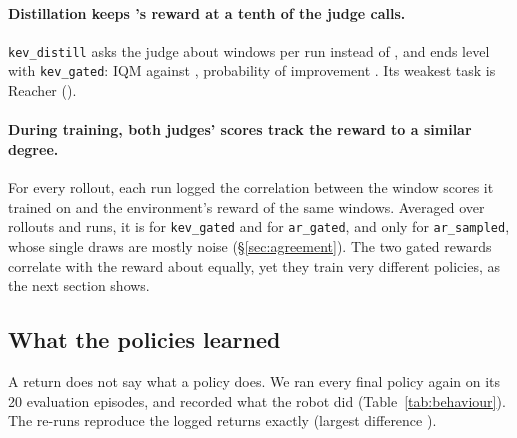 \paragraph{Distillation keeps \kev{}'s reward at a tenth of the judge calls.} \texttt{kev\_distill} asks the judge about
 windows per run instead of , and ends level with \texttt{kev\_gated}:
IQM  against , probability of improvement .
Its weakest task is Reacher ().

\paragraph{During training, both judges' scores track the reward to a similar degree.} For every rollout, each run
logged the correlation between the window scores it trained on and the environment's reward of the same windows. Averaged
over rollouts and runs, it is  for \texttt{kev\_gated} and  for
\texttt{ar\_gated}, and only  for \texttt{ar\_sampled}, whose single draws are mostly noise
(\S\ref{sec:agreement}). The two gated rewards correlate with the reward about equally, yet they train very different
policies, as the next section shows.

\subsection{What the policies learned}\label{sec:behaviour}

A return does not say what a policy does. We ran every final policy again on its 20 evaluation episodes, and recorded what
the robot did (Table~\ref{tab:behaviour}). The re-runs reproduce the logged returns exactly (largest difference
).

\begin{table}[t]
\centering\small

\caption{Behaviour of the final policies, averaged over episodes and seeds (20 evaluation episodes per run).
\emph{still}: fraction of steps with $|v_x|<0.1$\,m/s. \emph{runs flipped}: runs whose cheetah spends more than half of
the steps on its back ($\cos(\text{pitch})<0$). \emph{effort}: mean squared action, in $[0,1]$. \emph{distance}: mean
fingertip--target distance over the episode. The random policy samples its actions uniformly.}
\label{tab:behaviour}
\end{table}

